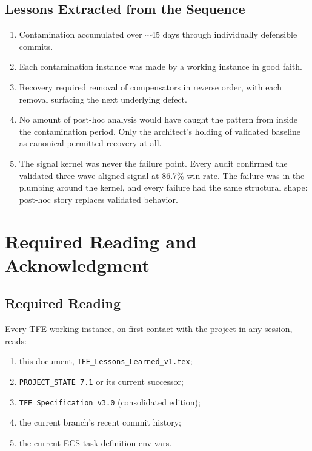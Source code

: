 \documentclass[11pt, a4paper]{article}
\theoremstyle{definition}
\begin{document}
\subsection{Lessons Extracted from the Sequence}

\begin{enumerate}[leftmargin=1.2cm]
\item Contamination accumulated over $\sim$45 days through individually
defensible commits.
\item Each contamination instance was made by a working instance in good
faith.
\item Recovery required removal of compensators in reverse order, with
each removal surfacing the next underlying defect.
\item No amount of post-hoc analysis would have caught the pattern from
inside the contamination period. Only the architect's holding of validated
baseline as canonical permitted recovery at all.
\item The signal kernel was never the failure point. Every audit confirmed
the validated three-wave-aligned signal at 86.7\% win rate. The failure
was in the plumbing around the kernel, and every failure had the same
structural shape: post-hoc story replaces validated behavior.
\end{enumerate}

\section{Required Reading and Acknowledgment}

\subsection{Required Reading}

Every TFE working instance, on first contact with the project in any
session, reads:

\begin{enumerate}[leftmargin=1.2cm]
\item this document, \texttt{TFE\_Lessons\_Learned\_v1.tex};
\item \texttt{PROJECT\_STATE 7.1} or its current successor;
\item \texttt{TFE\_Specification\_v3.0} (consolidated edition);
\item the current branch's recent commit history;
\item the current ECS task definition env vars.
\end{enumerate}
\end{document}
